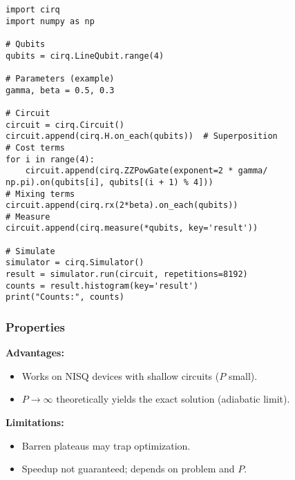 \begin{verbatim}
import cirq
import numpy as np

# Qubits
qubits = cirq.LineQubit.range(4)

# Parameters (example)
gamma, beta = 0.5, 0.3

# Circuit
circuit = cirq.Circuit()
circuit.append(cirq.H.on_each(qubits))  # Superposition
# Cost terms
for i in range(4):
    circuit.append(cirq.ZZPowGate(exponent=2 * gamma/ np.pi).on(qubits[i], qubits[(i + 1) % 4]))
# Mixing terms
circuit.append(cirq.rx(2*beta).on_each(qubits))
# Measure
circuit.append(cirq.measure(*qubits, key='result'))

# Simulate
simulator = cirq.Simulator()
result = simulator.run(circuit, repetitions=8192)
counts = result.histogram(key='result')
print("Counts:", counts)
\end{verbatim}

\subsubsection*{Properties}

\textbf{Advantages:}
\begin{itemize}
  \item Works on NISQ devices with shallow circuits ($P$ small).
  \item $P \to \infty$ theoretically yields the exact solution (adiabatic limit).
\end{itemize}

\textbf{Limitations:}
\begin{itemize}
  \item Barren plateaus may trap optimization.
  \item Speedup not guaranteed; depends on problem and $P$.
\end{itemize}


